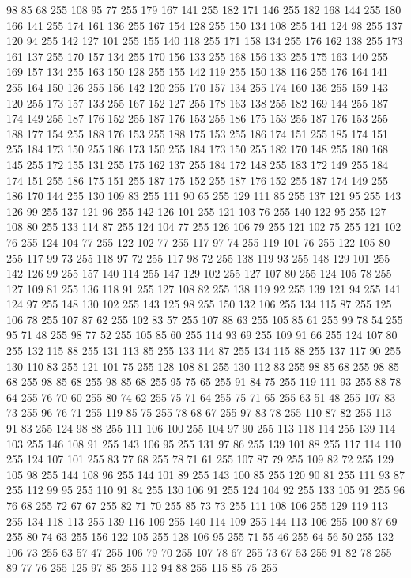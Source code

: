 98 85 68 255 108 95 77 255 179 167 141 255 182 171 146 255 182 168 144 255 180 166 141 255 174 161 136 255 167 154 128 255 150 134 108 255 141 124 98 255 137 120 94 255 142 127 101 255 155 140 118 255 171 158 134 255 176 162 138 255 173 161 137 255 170 157 134 255 170 156 133 255 168 156 133 255 175 163 140 255 169 157 134 255 163 150 128 255 155 142 119 255 150 138 116 255 176 164 141 255 164 150 126 255 156 142 120 255 170 157 134 255 174 160 136 255 159 143 120 255 173 157 133 255 167 152 127 255 178 163 138 255 182 169 144 255 187 174 149 255 187 176 152 255 187 176 153 255 186 175 153 255 187 176 153 255 188 177 154 255 188 176 153 255 188 175 153 255 186 174 151 255 185 174 151 255 184 173 150 255 186 173 150 255 184 173 150 255 182 170 148 255 180 168 145 255 172 155 131 255 175 162 137 255 184 172 148 255 183 172 149 255 184 174 151 255 186 175 151 255 187 175 152 255 187 176 152 255 187 174 149 255 186 170 144 255 130 109 83 255 111 90 65 255 129 111 85 255 137 121 95 255 143 126 99 255
137 121 96 255 142 126 101 255 121 103 76 255 140 122 95 255 127 108 80 255 133 114 87 255 124 104 77 255 126 106 79 255 121 102 75 255 121 102 76 255 124 104 77 255 122 102 77 255 117 97 74 255 119 101 76 255 122 105 80 255 117 99 73 255 118 97 72 255 117 98 72 255 138 119 93 255 148 129 101 255 142 126 99 255 157 140 114 255 147 129 102 255 127 107 80 255 124 105 78 255 127 109 81 255 136 118 91 255 127 108 82 255 138 119 92 255 139 121 94 255 141 124 97 255 148 130 102 255 143 125 98 255 150 132 106 255 134 115 87 255 125 106 78 255 107 87 62 255 102 83 57 255 107 88 63 255 105 85 61 255 99 78 54 255 95 71 48 255 98 77 52 255 105 85 60 255 114 93 69 255 109 91 66 255 124 107 80 255 132 115 88 255 131 113 85 255 133 114 87 255 134 115 88 255 137 117 90 255 130 110 83 255 121 101 75 255 128 108 81 255 130 112 83 255 98 85 68 255 98 85 68 255 98 85 68 255 98 85 68 255 95 75 65 255 91 84 75 255 119 111 93 255 88 78 64 255
76 70 60 255 80 74 62 255 75 71 64 255 75 71 65 255 63 51 48 255 107 83 73 255 96 76 71 255 119 85 75 255 78 68 67 255 97 83 78 255 110 87 82 255 113 91 83 255 124 98 88 255 111 106 100 255 104 97 90 255 113 118 114 255 139 114 103 255 146 108 91 255 143 106 95 255 131 97 86 255 139 101 88 255 117 114 110 255 124 107 101 255 83 77 68 255 78 71 61 255 107 87 79 255 109 82 72 255 129 105 98 255 144 108 96 255 144 101 89 255 143 100 85 255 120 90 81 255 111 93 87 255 112 99 95 255 110 91 84 255 130 106 91 255 124 104 92 255 133 105 91 255 96 76 68 255 72 67 67 255 82 71 70 255 85 73 73 255 111 108 106 255 129 119 113 255 134 118 113 255 139 116 109 255 140 114 109 255 144 113 106 255 100 87 69 255 80 74 63 255 156 122 105 255 128 106 95 255 71 55 46 255 64 56 50 255 132 106 73 255 63 57 47 255 106 79 70 255 107 78 67 255 73 67 53 255 91 82 78 255 89 77 76 255 125 97 85 255 112 94 88 255 115 85 75 255
